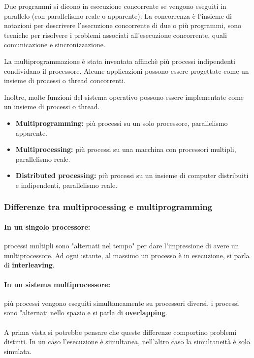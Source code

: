 Due programmi si dicono in esecuzione concorrente se vengono
eseguiti in parallelo (con parallelismo reale o apparente).
La concorrenza è l'insieme di notazioni per descrivere l'esecuzione concorrente di due o più programmi, sono tecniche per risolvere i problemi associati all'esecuzione concorrente, quali comunicazione e sincronizzazione.
\newline

La multiprogrammazione è stata inventata affinchè più processi
indipendenti condividano il processore. Alcune
applicazioni possono essere progettate come un insieme di processi
o thread concorrenti.

Inoltre, molte funzioni del sistema operativo possono essere implementate come un insieme di processi o thread.

\begin{itemize}
    \item \textbf{Multiprogramming:} più processi su un solo processore, parallelismo apparente.
    \item \textbf{Multiprocessing:} più processi su una macchina con processori multipli, parallelismo reale.
    \item \textbf{Distributed processing:} più processi su un insieme di computer distribuiti e indipendenti, parallelismo reale.
\end{itemize}

\subsubsection{Differenze tra multiprocessing e multiprogramming}
\paragraph{In un singolo processore:}processi multipli sono "alternati nel tempo" per dare l'impressione di
avere un multiprocessore. Ad ogni istante, al massimo un processo è in esecuzione, si parla di \textbf{interleaving}.

\paragraph{In un sistema multiprocessore:}più processi vengono eseguiti simultaneamente su processori diversi, i processi sono "alternati nello spazio e si parla di \textbf{overlapping}.

\paragraph{}
A prima vista si potrebbe pensare che queste differenze comportino
problemi distinti.
In un caso l'esecuzione è simultanea, nell'altro caso la simultaneità è solo simulata.

